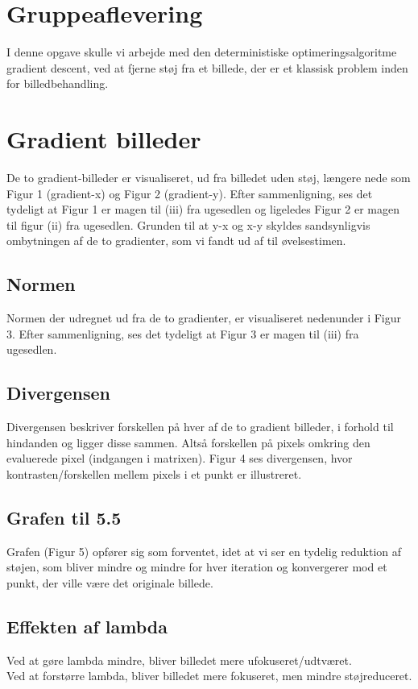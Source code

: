 \documentclass[12pt, a4paper]{article}
\begin{document}
\section*{Gruppeaflevering}
I denne opgave skulle vi arbejde med den deterministiske optimeringsalgoritme gradient descent, ved at fjerne støj fra et billede, der er et klassisk problem inden for billedbehandling.

\section*{Gradient billeder}
De to gradient-billeder er visualiseret, ud fra billedet uden støj, længere nede som Figur 1 (gradient-x) og Figur 2 (gradient-y).
Efter sammenligning, ses det tydeligt at Figur 1 er magen til (iii) fra ugesedlen og ligeledes Figur 2 er magen til figur (ii) fra ugesedlen.
Grunden til at y-x og x-y skyldes sandsynligvis ombytningen af de to gradienter, som vi fandt ud af til øvelsestimen.

\subsection*{Normen}
Normen der udregnet ud fra de to gradienter, er visualiseret nedenunder i Figur 3. Efter sammenligning, ses det tydeligt at Figur 3 er magen til (iii) fra ugesedlen.

\subsection*{Divergensen}
Divergensen beskriver forskellen på hver af de to gradient billeder, i forhold til hindanden og ligger disse sammen. Altså forskellen på pixels omkring den evaluerede pixel (indgangen i matrixen). Figur 4 ses divergensen, hvor kontrasten/forskellen mellem pixels i et punkt er illustreret.

\subsection*{Grafen til 5.5}
Grafen (Figur 5) opfører sig som forventet, idet at vi ser en tydelig reduktion af støjen, som bliver mindre og mindre for hver iteration og konvergerer mod et punkt, der ville være det originale billede.

\subsection*{Effekten af lambda}
Ved at gøre lambda mindre, bliver billedet mere ufokuseret/udtværet.\\
Ved at forstørre lambda, bliver billedet mere fokuseret, men mindre støjreduceret.
\end{document}
